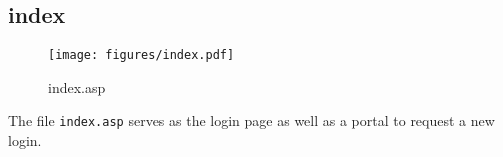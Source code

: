 \subsection{index}
\begin{figure}[htb]
    \begin{center}
        \texttt{[image: figures/index.pdf]}
    \end{center}
    \caption{index.asp}
    \label{fig:index}
\end{figure}

The file \verb|index.asp| serves as the login page as well as a portal to
request a new login.
